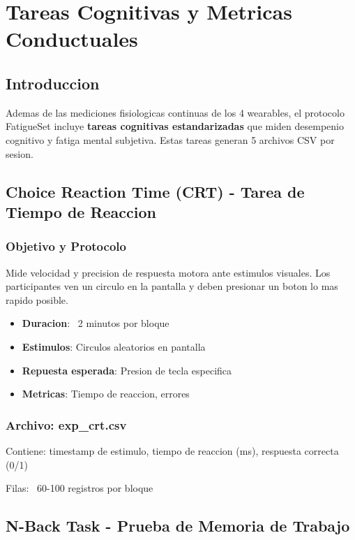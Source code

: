 \chapter{Tareas Cognitivas y Metricas Conductuales}
\label{cap:cognitive_tasks}

\section{Introduccion}

Ademas de las mediciones fisiologicas continuas de los 4 wearables, el protocolo
FatigueSet incluye \textbf{tareas cognitivas estandarizadas} que miden desempenio
cognitivo y fatiga mental subjetiva. Estas tareas generan 5 archivos CSV por sesion.

\section{Choice Reaction Time (CRT) - Tarea de Tiempo de Reaccion}

\subsection{Objetivo y Protocolo}

Mide velocidad y precision de respuesta motora ante estimulos visuales. Los participantes
ven un circulo en la pantalla y deben presionar un boton lo mas rapido posible.

\begin{itemize}
    \item \textbf{Duracion}: ~2 minutos por bloque
    \item \textbf{Estimulos}: Circulos aleatorios en pantalla
    \item \textbf{Repuesta esperada}: Presion de tecla especifica
    \item \textbf{Metricas}: Tiempo de reaccion, errores
\end{itemize}

\subsection{Archivo: exp\_crt.csv}

Contiene: timestamp de estimulo, tiempo de reaccion (ms), respuesta correcta (0/1)

Filas: ~60-100 registros por bloque

\section{N-Back Task - Prueba de Memoria de Trabajo}

